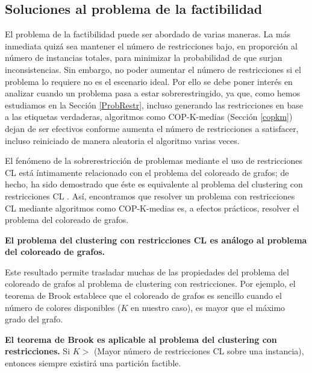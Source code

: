 \subsection{Soluciones al problema de la factibilidad} \label{problemaFactib}

El problema de la factibilidad puede ser abordado de varias maneras. La más inmediata quizá sea mantener el número de restricciones bajo, en proporción al número de instancias totales, para minimizar la probabilidad de que surjan inconsistencias. Sin embargo, no poder aumentar el número de restricciones si el problema lo requiere no es el escenario ideal. Por ello se debe poner interés en analizar cuando un problema pasa a estar sobrerestringido, ya que, como hemos estudiamos en la Sección \ref{ProbRestr}, incluso generando las restricciones en base a las etiquetas verdaderas, algoritmos como COP-K-medias (Sección \ref{copkm}) dejan de ser efectivos conforme aumenta el número de restricciones a satisfacer, incluso reiniciado de manera aleatoria el algoritmo varias veces.

El fenómeno de la sobrerestricción de problemas mediante el uso de restricciones \acf{CL} está íntimamente relacionado con el problema del coloreado de grafos; de hecho, ha sido demostrado que éste es equivalente al problema del clustering con restricciones \acs{CL} \cite{davidson2006identifying}. Así, encontramos que resolver un problema con restricciones \acs{CL} mediante algoritmos como COP-K-medias es, a efectos prácticos, resolver el problema del coloreado de grafos.

\begin{observacion}
	
	\textbf{El problema del clustering con restricciones \acs{CL} es análogo al problema del coloreado de grafos.} \cite{davidson2007survey}
	
\end{observacion}

Este resultado permite trasladar muchas de las propiedades del problema del coloreado de grafos al problema de clustering con restricciones. Por ejemplo, el teorema de Brook establece que el coloreado de grafos es sencillo cuando el número de colores disponibles ($K$ en nuestro caso), es mayor que el máximo grado del grafo. 

\begin{observacion}
	
	\textbf{El teorema de Brook es aplicable al problema del clustering con restricciones.}
	Si $ K > $ (Mayor número de restricciones \acs{CL} sobre una instancia), entonces siempre existirá una partición factible. \cite{davidson2007survey} \label{ob:observacion37}
	
\end{observacion}

